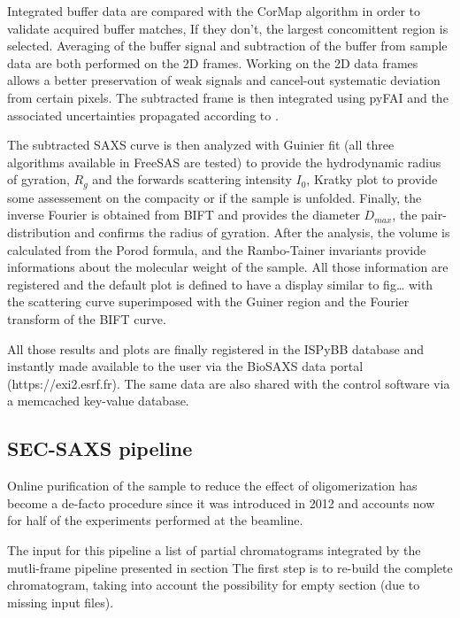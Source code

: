 \documentclass[preprint]{iucr}              %
\begin{document}
Integrated buffer data are compared with the CorMap algorithm in order to validate acquired buffer matches, 
If they don't, the largest concomittent region is selected. 
Averaging of the buffer signal and subtraction of the buffer from sample data are both performed on the 
2D frames. 
Working on the 2D data frames allows a better preservation of weak signals and cancel-out systematic deviation
from certain pixels.
The subtracted frame is then integrated using pyFAI and the associated uncertainties propagated according to \cite{pyfai_2020}.

The subtracted SAXS curve is then analyzed with Guinier fit (all three algorithms available in FreeSAS are tested)
to provide the hydrodynamic radius of gyration, $R_g$ and the forwards scattering intensity $I_0$, 
Kratky plot to provide some assessement on the compacity or if the sample is unfolded. 
Finally, the inverse Fourier is obtained from BIFT and provides the diameter $D_{max}$, the pair-distribution 
and confirms the radius of gyration.
After the analysis, the volume is calculated from the Porod formula, and the Rambo-Tainer invariants provide 
informations about the molecular weight of the sample.
All those information are registered and the default plot is defined to have a display similar to fig\ldots
with the scattering curve superimposed with the Guiner region and the Fourier transform of the BIFT curve.

All those results and plots are finally registered in the ISPyBB database and instantly made available to the user via
the BioSAXS data portal (https://exi2.esrf.fr). 
The same data are also shared with the control software via a memcached key-value database.  
       

\subsection{SEC-SAXS pipeline}
Online purification of the sample to reduce the effect of oligomerization has become a de-facto procedure
since it was introduced in 2012 \cite{SECPaper2012} and accounts now for half of the experiments performed at the beamline.

The input for this pipeline a list of partial chromatograms integrated by the mutli-frame pipeline presented in section {}
The first step is to re-build the complete chromatogram, taking into account the possibility for empty section (due to missing input files).
\end{document}

